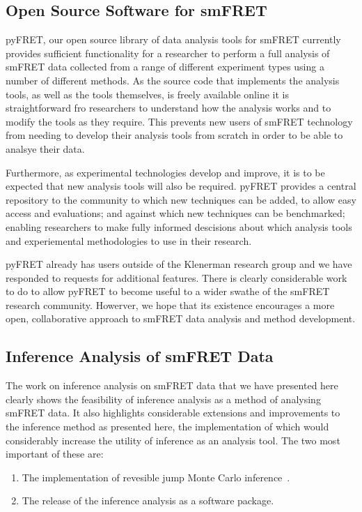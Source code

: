 \subsection{Open Source Software for smFRET}
pyFRET, our open source library of data analysis tools for smFRET currently provides sufficient functionality for a researcher to perform a full analysis of smFRET data collected from a range of different experiment types using a number of different methods. As the source code that implements the analysis tools, as well as the tools themselves, is freely available online it is straightforward fro researchers to understand how the analysis works and to modify the tools as they require. This prevents new users of smFRET technology from needing to develop their analysis tools from scratch in order to be able to analsye their data. 

Furthermore, as experimental technologies develop and improve, it is to be expected that new analysis tools will also be required. pyFRET provides a central repository to the community to which new techniques can be added, to allow easy access and evaluations; and against which new techniques can be benchmarked; enabling researchers to make fully informed descisions about which analysis tools and experiemental methodologies to use in their research.

pyFRET already has users outside of the Klenerman research group and we have responded to requests for additional features. There is clearly considerable work to do to allow pyFRET to become useful to a wider swathe of the smFRET research community. Howerver, we hope that its existence encourages a more open, collaborative approach to smFRET data analysis and method development. 

\subsection{Inference Analysis of smFRET Data}
The work on inference analysis on smFRET data that we have presented here clearly shows the feasibility of inference analysis as a method of analysing smFRET data. It also highlights considerable extensions and improvements to the inference method as presented here, the implementation of which would considerably increase the utility of inference as an analysis tool. The two most important of these are:

\begin{enumerate}
\item The implementation of revesible jump Monte Carlo inference~\cite{green1995}.
\item The release of the inference analysis as a software package.
\end{enumerate}

